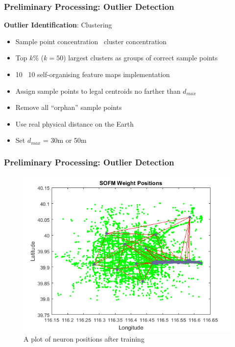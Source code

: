 \documentclass{beamer}
\theoremstyle{definition}
\begin{document}
\begin{frame}
\frametitle{Preliminary Processing: Outlier Detection}
\textbf{Outlier Identification}: Clustering
\begin{itemize}
	\item <2-> Sample point concentration \textrightarrow~cluster concentration
	\item <3-> Top $k\%$ ($k = 50$) largest clusters as groups of correct sample points
	\item <4-> 10 \texttimes~10 self-organising feature maps implementation
\end{itemize}

\begin{itemize}
	\item <6-> Assign sample points to legal centroids no farther than $d_{max}$
	\item <7-> Remove all ``orphan'' sample points
	\item <8-> Use real physical distance on the Earth
	\item <9-> Set $d_{max}$ = 30m or 50m
\end{itemize}

\end{frame}

\begin{frame}
\frametitle{Preliminary Processing: Outlier Detection}

\begin{figure}[h!]
\includegraphics[scale = 0.48]{sofm_weights} 
\caption{A plot of neuron positions after training}
\label{Fig:sofm_weights}
\end{figure}
\end{frame}
\end{document}

